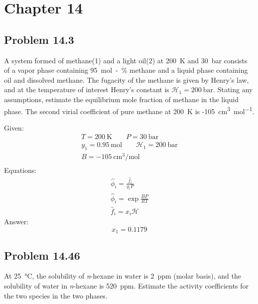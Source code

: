 \section*{Chapter 14}

\subsection*{Problem 14.3}

A system formed of methane(1) and a light oil(2) at 200~\unit{\kelvin} and
30~\unit{\bar} consists of a vapor phase containing 95~\unit{\mole-\%} methane
and a liquid phase containing oil and dissolved methane. The fugacity of the
methane is given by Henry's law, and at the temperature of interest Henry's
constant is \(\mathcal{H}_1 = 200~\unit{\bar}\). Stating any assumptions,
estimate the equilibrium mole fraction of methane in the liquid
phase. The second virial coefficient of pure methane at 200~\unit{\kelvin} is
-105~\unit{\centi\meter\cubed\per\mole}.

\begin{solution}
  Given:
  \begin{gather*}
    T = 200~\unit{\kelvin} \qquad P = 30~\unit{\bar} \\
    y_1 = 0.95~\unit{\mole} \qquad \mathcal{H}_1 = 200~\unit{\bar} \\
    B = - 105~\unit{\centi\meter\cubed\per\mole} \\
  \end{gather*}
  Equations:
  \begin{gather*}
    \hat{\phi}_i = \frac{\hat{f}_i}{y_iP} \\
    \hat{\phi}_i = \exp{\frac{BP}{RT}} \\
    \hat{f}_i = x_i\mathcal{H}
  \end{gather*}
  Answer:
  \begin{equation*}
    \boxed{x_1 = 0.1179}
  \end{equation*}
\end{solution}

\subsection*{Problem 14.46}
At 25~\unit{\degreeCelsius}, the solubility of \textit{n}-hexane in water is
2~\unit{ppm} (molar basis), and the solubility of water in \textit{n}-hexane is
520~\unit{ppm}. Estimate the activity coefficients for the two species in the
two phases.

